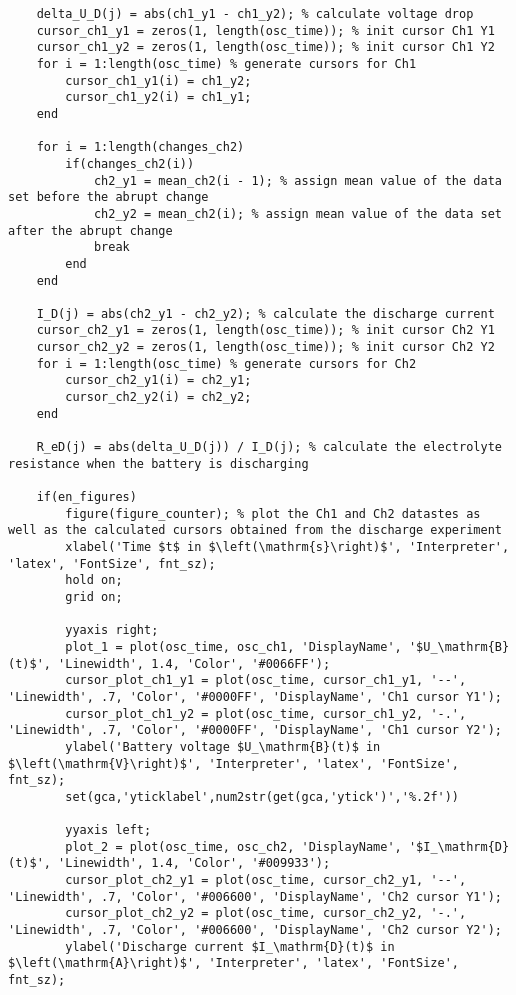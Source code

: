 \begin{lstlisting}
    delta_U_D(j) = abs(ch1_y1 - ch1_y2); % calculate voltage drop
    cursor_ch1_y1 = zeros(1, length(osc_time)); % init cursor Ch1 Y1
    cursor_ch1_y2 = zeros(1, length(osc_time)); % init cursor Ch1 Y2
    for i = 1:length(osc_time) % generate cursors for Ch1
        cursor_ch1_y1(i) = ch1_y2;
        cursor_ch1_y2(i) = ch1_y1;
    end  

    for i = 1:length(changes_ch2)
        if(changes_ch2(i)) 
            ch2_y1 = mean_ch2(i - 1); % assign mean value of the data set before the abrupt change
            ch2_y2 = mean_ch2(i); % assign mean value of the data set after the abrupt change
            break
        end
    end

    I_D(j) = abs(ch2_y1 - ch2_y2); % calculate the discharge current
    cursor_ch2_y1 = zeros(1, length(osc_time)); % init cursor Ch2 Y1
    cursor_ch2_y2 = zeros(1, length(osc_time)); % init cursor Ch2 Y2
    for i = 1:length(osc_time) % generate cursors for Ch2
        cursor_ch2_y1(i) = ch2_y1;
        cursor_ch2_y2(i) = ch2_y2;
    end

    R_eD(j) = abs(delta_U_D(j)) / I_D(j); % calculate the electrolyte resistance when the battery is discharging
    
    if(en_figures) 
        figure(figure_counter); % plot the Ch1 and Ch2 datastes as well as the calculated cursors obtained from the discharge experiment
        xlabel('Time $t$ in $\left(\mathrm{s}\right)$', 'Interpreter', 'latex', 'FontSize', fnt_sz);
        hold on;
        grid on;
        
        yyaxis right;
        plot_1 = plot(osc_time, osc_ch1, 'DisplayName', '$U_\mathrm{B}(t)$', 'Linewidth', 1.4, 'Color', '#0066FF');
        cursor_plot_ch1_y1 = plot(osc_time, cursor_ch1_y1, '--', 'Linewidth', .7, 'Color', '#0000FF', 'DisplayName', 'Ch1 cursor Y1');
        cursor_plot_ch1_y2 = plot(osc_time, cursor_ch1_y2, '-.', 'Linewidth', .7, 'Color', '#0000FF', 'DisplayName', 'Ch1 cursor Y2');
        ylabel('Battery voltage $U_\mathrm{B}(t)$ in $\left(\mathrm{V}\right)$', 'Interpreter', 'latex', 'FontSize', fnt_sz);
        set(gca,'yticklabel',num2str(get(gca,'ytick')','%.2f'))
        
        yyaxis left;
        plot_2 = plot(osc_time, osc_ch2, 'DisplayName', '$I_\mathrm{D}(t)$', 'Linewidth', 1.4, 'Color', '#009933');
        cursor_plot_ch2_y1 = plot(osc_time, cursor_ch2_y1, '--', 'Linewidth', .7, 'Color', '#006600', 'DisplayName', 'Ch2 cursor Y1');
        cursor_plot_ch2_y2 = plot(osc_time, cursor_ch2_y2, '-.', 'Linewidth', .7, 'Color', '#006600', 'DisplayName', 'Ch2 cursor Y2');
        ylabel('Discharge current $I_\mathrm{D}(t)$ in $\left(\mathrm{A}\right)$', 'Interpreter', 'latex', 'FontSize', fnt_sz);
        

\end{lstlisting}
